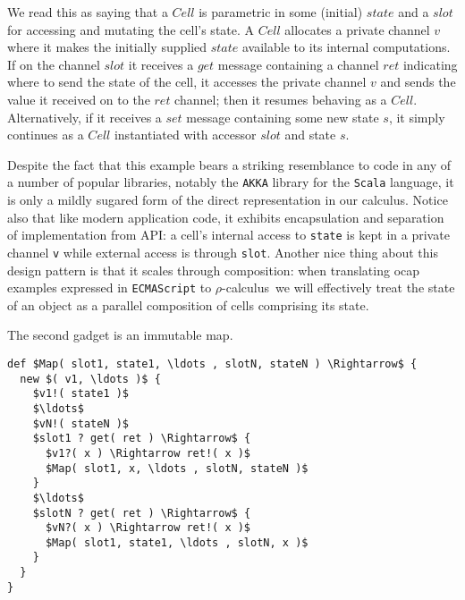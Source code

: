 \documentclass[]{amsart}
\theoremstyle{definition}
\theoremstyle{remark}
\numberwithin{equation}{subsection}
\newcommand{\rhoc}{$\rho$-calculus}
\begin{document}

We read this as saying that a $Cell$ is parametric in some (initial)
$state$ and a $slot$ for accessing and mutating the cell's state. A
$Cell$ allocates a private channel $v$ where it makes the initially
supplied $state$ available to its internal computations. If on the
channel $slot$ it receives a $get$ message containing a channel $ret$
indicating where to send the state of the cell, it accesses the
private channel $v$ and sends the value it received on to the $ret$
channel; then it resumes behaving as a $Cell$. Alternatively, if it
receives a $set$ message containing some new state $s$, it simply
continues as a $Cell$ instantiated with accessor $slot$ and state $s$.

Despite the fact that this example bears a striking resemblance to code
in any of a number of popular libraries, notably the {\tt AKKA}
library for the {\tt Scala} language, it is only a mildly sugared
form of the direct representation in our calculus. Notice also that
like modern application code, it exhibits encapsulation and separation
of implementation from API: a cell's internal access to
{\tt state} is kept in a private channel {\tt v} while
external access is through {\tt slot}. Another nice thing about
this design pattern is that it scales through composition: when
translating ocap examples expressed in {\tt ECMAScript} to \rhoc\
we will effectively treat the state of an object as a parallel
composition of cells comprising its state.

The second gadget is an immutable map.

\begin{lstlisting}[mathescape]
def $Map( slot1, state1, \ldots , slotN, stateN ) \Rightarrow$ {
  new $( v1, \ldots )$ {
    $v1!( state1 )$
    $\ldots$
    $vN!( stateN )$
    $slot1 ? get( ret ) \Rightarrow$ { 
      $v1?( x ) \Rightarrow ret!( x )$
      $Map( slot1, x, \ldots , slotN, stateN )$
    }
    $\ldots$
    $slotN ? get( ret ) \Rightarrow$ { 
      $vN?( x ) \Rightarrow ret!( x )$
      $Map( slot1, state1, \ldots , slotN, x )$
    }
  }
}
\end{lstlisting}
\end{document}
